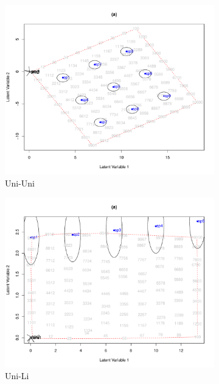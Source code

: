 		\begin{figure}[h!]
			
			\begin{subfigure}{.50\textwidth}		
				\centering
				\includegraphics[width=1\linewidth]{"../02_Figures/CQOSM1"}
				\caption{Uni-Uni}
			\end{subfigure}
			\begin{subfigure}{.5\textwidth}
				\centering		
				\includegraphics[width=1\linewidth]{"../02_Figures/CQOSM2"}
				\caption{Uni-Li}
			\end{subfigure}
			\begin{subfigure}{.5\textwidth}	

\end{subfigure}
\end{figure}
